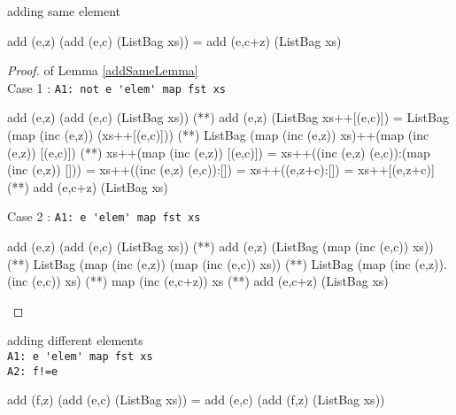 \begin{lemma}\label{addSameLemma} adding same element
\begin{code}
add (e,z) (add (e,c) (ListBag xs)) = add (e,c+z) (ListBag xs)
\end{code}
\end{lemma}
\begin{proof} of Lemma \ref{addSameLemma}\\
Case 1 : \verb|A1: not e 'elem' map fst xs|
\begin{code}
add (e,z) (add (e,c) (ListBag xs)) 
             (**) add (e,z) (ListBag xs++[(e,c)])
             = ListBag (map (inc (e,z)) (xs++[(e,c)]))
             (**) ListBag (map (inc (e,z)) xs)++(map (inc (e,z)) [(e,c)])
             (**) xs++(map (inc (e,z)) [(e,c)])
             = xs++((inc (e,z) (e,c)):(map (inc (e,z)) []))
             = xs++((inc (e,z) (e,c)):[])
             = xs++((e,z+c):[])
             = xs++[(e,z+c)]
             (**) add (e,c+z) (ListBag xs)
\end{code}
Case 2 : \verb|A1: e 'elem' map fst xs|
\begin{code}
add (e,z) (add (e,c) (ListBag xs)) 
             (**) add (e,z) (ListBag (map (inc (e,c)) xs))
             (**) ListBag (map (inc (e,z)) (map (inc (e,c)) xs))
             (**) ListBag (map (inc (e,z)).(inc (e,c)) xs)
             (**) map (inc (e,c+z)) xs
             (**) add (e,c+z) (ListBag xs)
\end{code}
\end{proof}
\begin{lemma}\label{addDiffLemma}adding different elements\\
\verb|A1: e 'elem' map fst xs|\\
\verb|A2: f!=e|
\begin{code}
add (f,z) (add (e,c) (ListBag xs)) = add (e,c) (add (f,z) (ListBag xs))
\end{code}
\end{lemma}
